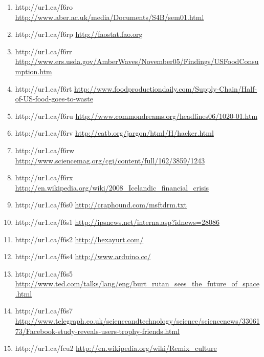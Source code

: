 \begin{enumerate}
    \item{http://ur1.ca/f6ro}
        \url{http://www.aber.ac.uk/media/Documents/S4B/sem01.html}

    \item{http://ur1.ca/f6rp}
        \url{http://faostat.fao.org}

    \item{http://ur1.ca/f6rr}
        \url{http://www.ers.usda.gov/AmberWaves/November05/Findings/USFoodConsumption.htm}

    \item{http://ur1.ca/f6rt}
        \url{http://www.foodproductiondaily.com/Supply-Chain/Half-of-US-food-goes-to-waste}

    \item{http://ur1.ca/f6ru}
        \url{http://www.commondreams.org/headlines06/1020-01.htm}

    \item{http://ur1.ca/f6rv}
        \url{http://catb.org/jargon/html/H/hacker.html}

    \item{http://ur1.ca/f6rw}
        \url{http://www.sciencemag.org/cgi/content/full/162/3859/1243}

    \item{http://ur1.ca/f6rx}
        \url{http://en.wikipedia.org/wiki/2008\_Icelandic\_financial\_crisis}

    \item{http://ur1.ca/f6s0}
        \url{http://craphound.com/msftdrm.txt}

    \item{http://ur1.ca/f6s1}
        \url{http://ipsnews.net/interna.asp?idnews=28086}

    \item{http://ur1.ca/f6s2}
        \url{http://hexayurt.com/}

    \item{http://ur1.ca/f6s4}
        \url{http://www.arduino.cc/}

    \item{http://ur1.ca/f6s5}
        \url{http://www.ted.com/talks/lang/eng/burt\_rutan\_sees\_the\_future\_of\_space.html}

    \item{http://ur1.ca/f6s7}
        \url{http://www.telegraph.co.uk/scienceandtechnology/science/sciencenews/3306173/Facebook-study-reveals-users-trophy-friends.html}

    \item{http://ur1.ca/fcu2}
        \url{http://en.wikipedia.org/wiki/Remix\_culture}


\end{enumerate}
